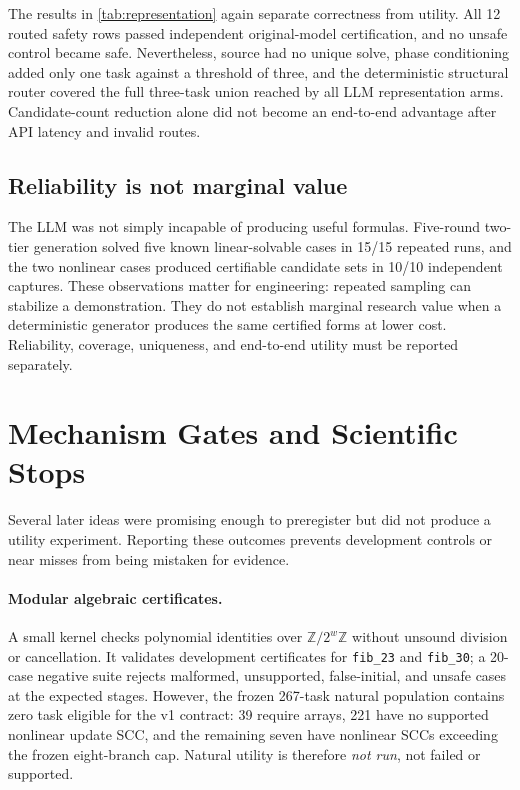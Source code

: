 \documentclass[10pt]{article}
\newcommand{\code}[1]{\texttt{#1}}
\begin{document}
The results in \cref{tab:representation} again separate correctness from
utility.  All 12 routed safety rows passed independent original-model
certification, and no unsafe control became safe.  Nevertheless, source had no
unique solve, phase conditioning added only one task against a threshold of
three, and the deterministic structural router covered the full three-task
union reached by all LLM representation arms.  Candidate-count reduction alone
did not become an end-to-end advantage after API latency and invalid routes.

\subsection{Reliability is not marginal value}

The LLM was not simply incapable of producing useful formulas.  Five-round
two-tier generation solved five known linear-solvable cases in 15/15 repeated
runs, and the two nonlinear cases produced certifiable candidate sets in 10/10
independent captures.  These observations matter for engineering: repeated
sampling can stabilize a demonstration.  They do not establish marginal
research value when a deterministic generator produces the same certified
forms at lower cost.  Reliability, coverage, uniqueness, and end-to-end utility
must be reported separately.

\section{Mechanism Gates and Scientific Stops}
\label{sec:stops}

Several later ideas were promising enough to preregister but did not produce a
utility experiment.  Reporting these outcomes prevents development controls or
near misses from being mistaken for evidence.

\paragraph{Modular algebraic certificates.}
A small kernel checks polynomial identities over $\mathbb{Z}/2^w\mathbb{Z}$
without unsound division or cancellation.  It validates development
certificates for \code{fib\_23} and \code{fib\_30}; a 20-case negative suite
rejects malformed, unsupported, false-initial, and unsafe cases at the expected
stages.  However, the frozen 267-task natural population contains zero task
eligible for the v1 contract: 39 require arrays, 221 have no supported
nonlinear update SCC, and the remaining seven have nonlinear SCCs exceeding
the frozen eight-branch cap.  Natural utility is therefore \emph{not run}, not
failed or supported.
\end{document}
